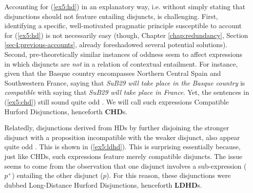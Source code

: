 Accounting for (\ref{ex5:hd}) in an explanatory way, i.e. without simply stating that disjunctions should not feature entailing disjuncts, is challenging. First, identifying a specific, well-motivated pragmatic principle susceptible to account for (\ref{ex5:hd}) is not necessarily easy (though, Chapter \ref{chap:redundancy}, Section \ref{sec4:previous-accounts}, already foreshadowed several potential solutions). Second, pre-theoretically similar instances of oddness seem to affect expressions in which disjuncts are \textit{not} in a relation of contextual entailment. For instance, given that the Basque country encompasses Northern Central Spain and Southwestern France, saying that \textit{SuB29 will take place in the Basque country} is \textit{compatible} with saying that \textit{SuB29 will take place in France}. Yet, the sentences in (\ref{ex5:chd}) still sound quite odd \parencite{Singh2008a}. We will call such expressions Compatible Hurford Disjunctions, henceforth \textbf{CHD}s.
\begin{exe}
	\ex \label{ex5:chd}
	\begin{xlist}
		\label{ex5:chd-1}
		\label{ex5:chd-2}
	\end{xlist}
\end{exe} 

Relatedly, disjunctions derived from HDs by further disjoining the stronger disjunct with a proposition incompatible with the weaker disjunct, also appear quite odd \parencite{Marty2022}. This is shown in (\ref{ex5:ldhd}). This is surprising essentially because, just like CHDs, such expressions feature merely compatible disjuncts. The issue seems to come from the observation that one disjunct involves a sub-expression ($p^+$) entailing the other disjunct ($p$). For this reason, these disjunctions were dubbed Long-Distance Hurford Disjunctions, henceforth \textbf{LDHD}s.

\begin{exe}
	\ex \label{ex5:ldhd}
	\begin{xlist}
		\label{ex5:ldhd-sw}
		\label{ex5:ldhd-ws}
	\end{xlist}
\end{exe}



